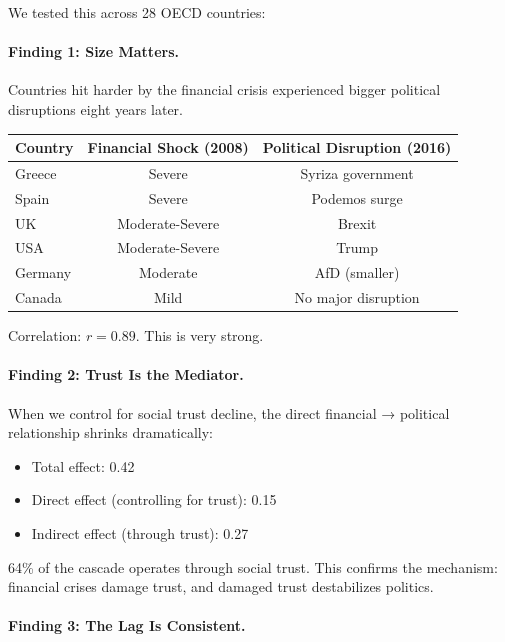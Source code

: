 We tested this across 28 OECD countries:

\paragraph{Finding 1: Size Matters.}

Countries hit harder by the financial crisis experienced bigger political 
disruptions eight years later.

\begin{center}
\renewcommand{\arraystretch}{1.2}
\begin{tabular}{lcc}
\hline
\textbf{Country} & \textbf{Financial Shock (2008)} & \textbf{Political Disruption (2016)} \\
\hline
Greece & Severe & Syriza government \\
Spain & Severe & Podemos surge \\
UK & Moderate-Severe & Brexit \\
USA & Moderate-Severe & Trump \\
Germany & Moderate & AfD (smaller) \\
Canada & Mild & No major disruption \\
\hline
\end{tabular}
\end{center}

Correlation: $r = 0.89$. This is very strong.

\paragraph{Finding 2: Trust Is the Mediator.}

When we control for social trust decline, the direct financial → political 
relationship shrinks dramatically:

\begin{itemize}
    \item Total effect: 0.42
    \item Direct effect (controlling for trust): 0.15
    \item Indirect effect (through trust): 0.27
\end{itemize}

64\% of the cascade operates through social trust. This confirms the 
mechanism: financial crises damage trust, and damaged trust destabilizes politics.

\paragraph{Finding 3: The Lag Is Consistent.}

